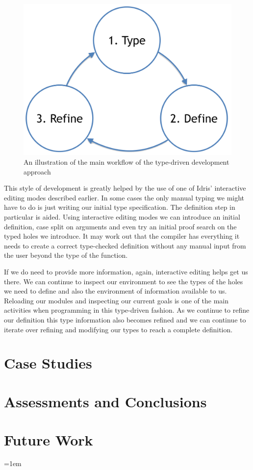\documentclass[a4paper, notitlepage]{report}
\begin{document}
\begin{figure}[H]
\centering
\includegraphics[width=0.8\linewidth]{./fig/tdd_cycle.png}
\caption{An illustration of the main workflow of the type-driven development approach}
\end{figure}

This style of development is greatly helped by the use of one of Idris'
interactive editing modes described earlier. In some cases the only manual
typing we might have to do is just writing our initial type specification. The
definition step in particular is aided. Using interactive editing modes we can
introduce an initial definition, case split on arguments and even try an initial
proof search on the typed holes we introduce. It may work out that the compiler
has everything it needs to create a correct type-checked definition without any
manual input from the user beyond the type of the function.

If we do need to provide more information, again, interactive editing helps get
us there. We can continue to inspect our environment to see the types of the
holes we need to define and also the environment of information available to us.
Reloading our modules and inspecting our current goals is one of the main
activities when programming in this type-driven fashion. As we continue to
refine our definition this type information also becomes refined and we can
continue to iterate over refining and modifying our types to reach a complete
definition.
\chapter{Case Studies}
\label{sec:orgbd24baf}
\chapter{Assessments and Conclusions}
\label{sec:org57d2fbd}
\chapter{Future Work}
\label{sec:org9058143}

\emergencystretch=1em
\printbibliography[heading=bibintoc, title=References]
\appendix
\end{document}
